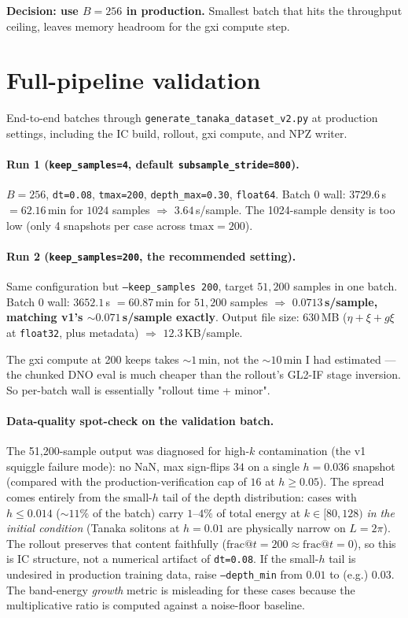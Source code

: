 \documentclass[11pt]{article}
\begin{document}
\textbf{Decision: use $B = 256$ in production.} Smallest batch that hits the throughput
ceiling, leaves memory headroom for the gxi compute step.

\section{Full-pipeline validation}
\label{sec:validation}

End-to-end batches through \texttt{generate\_tanaka\_dataset\_v2.py} at production
settings, including the IC build, rollout, gxi compute, and NPZ writer.

\paragraph{Run 1 (\texttt{keep\_samples=4}, default \texttt{subsample\_stride=800}).}
$B=256$, \texttt{dt=0.08}, \texttt{tmax=200}, \texttt{depth\_max=0.30},
\texttt{float64}.
Batch 0 wall: $3729.6$\,s $= 62.16$\,min for $1024$ samples $\Rightarrow$
$3.64$\,s/sample. The 1024-sample density is too low (only 4 snapshots per
case across $\text{tmax}=200$).

\paragraph{Run 2 (\texttt{keep\_samples=200}, the recommended setting).}
Same configuration but \texttt{--keep\_samples 200}, target $51{,}200$ samples
in one batch. Batch 0 wall: $3652.1$\,s $= 60.87$\,min for $51{,}200$ samples
$\Rightarrow$ \textbf{$0.0713$\,s/sample, matching v1's $\sim\!0.071$\,s/sample exactly}.
Output file size: $630$\,MB ($\eta + \xi + g\xi$ at \texttt{float32}, plus
metadata) $\Rightarrow$ $12.3$\,KB/sample.

The gxi compute at 200 keeps takes $\sim\!1$\,min, not the $\sim\!10$\,min I had
estimated --- the chunked DNO eval is much cheaper than the rollout's GL2-IF stage
inversion. So per-batch wall is essentially "rollout time + minor".

\paragraph{Data-quality spot-check on the validation batch.} The 51,200-sample
output was diagnosed for high-$k$ contamination (the v1 squiggle failure mode):
no NaN, max sign-flips $34$ on a single $h=0.036$ snapshot (compared with
the production-verification cap of $16$ at $h \ge 0.05$). The spread comes entirely
from the small-$h$ tail of the depth distribution: cases with $h \le 0.014$
($\sim\!11\%$ of the batch) carry $1$--$4\%$ of total energy at $k\!\in\![80,128)$
\emph{in the initial condition} (Tanaka solitons at $h=0.01$ are physically narrow
on $L=2\pi$). The rollout preserves that content faithfully ($\text{frac}@t\!=\!200
\approx \text{frac}@t\!=\!0$), so this is IC structure, not a numerical artifact
of \texttt{dt=0.08}. If the small-$h$ tail is undesired in production training data,
raise \texttt{--depth\_min} from $0.01$ to (e.g.) $0.03$. The band-energy
\emph{growth} metric is misleading for these cases because the multiplicative
ratio is computed against a noise-floor baseline.
\end{document}
